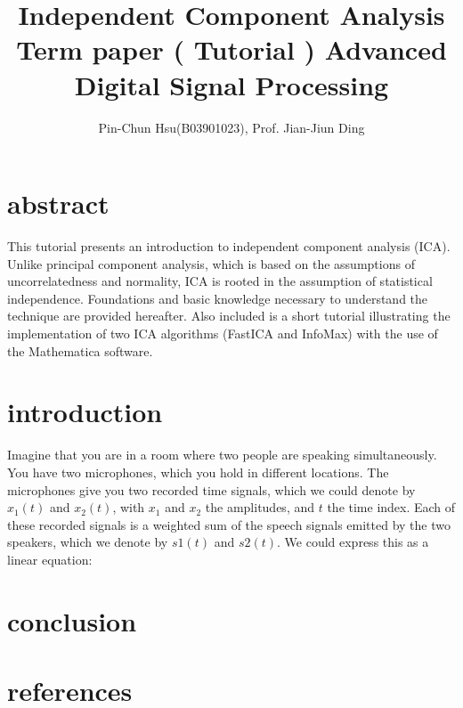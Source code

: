 \documentclass[12pt, a4paper, onecolumn]{IEEEtran}
\title{%
    Independent Component Analysis \\
  \large Term paper ( Tutorial ) Advanced Digital Signal Processing }
\author{Pin-Chun Hsu(B03901023), Prof. Jian-Jiun Ding}
\begin{document}
\maketitle
\section{abstract}
This tutorial presents an introduction to independent component analysis (ICA). Unlike principal component analysis, which is based on the assumptions of uncorrelatedness and  normality,  ICA  is  rooted  in  the  assumption  of  statistical  independence. Foundations and basic knowledge necessary to understand the technique are provided hereafter. Also included is a short  tutorial illustrating the implementation of two ICA algorithms (FastICA and InfoMax) with the use of the Mathematica software.
\section{introduction}

Imagine that you are in a room where two people are speaking simultaneously. You have two microphones, which you hold in different locations. The microphones give you two recorded time signals, which we could denote by $x_1(t)$ and $x_2(t)$, with $x_1$ and $x_2$ the amplitudes, and $t$ the time index. Each of these recorded signals is a weighted sum of the speech signals emitted by the two speakers, which we denote by $s1(t)$ and $s2(t)$. We could express this as a linear equation:
\section{conclusion}
\section{references}
\end{document}
